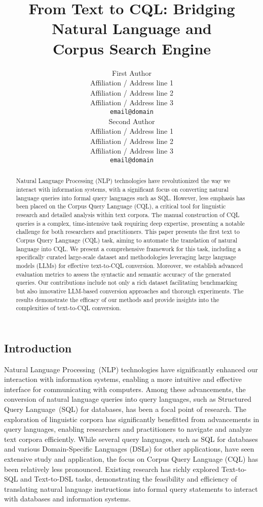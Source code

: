 \documentclass[11pt]{article}
\title{From Text to CQL: Bridging Natural Language and \\Corpus  Search Engine}
\author{First Author \\
  Affiliation / Address line 1 \\
  Affiliation / Address line 2 \\
  Affiliation / Address line 3 \\
  \texttt{email@domain} \\\And
  Second Author \\
  Affiliation / Address line 1 \\
  Affiliation / Address line 2 \\
  Affiliation / Address line 3 \\
  \texttt{email@domain} \\}
\begin{document}
\begin{CJK*}{UTF8}{gbsn}
\maketitle
\begin{abstract}
Natural Language Processing (NLP) technologies have revolutionized the way we interact with information systems, with a significant focus on converting natural language queries into formal query languages such as SQL. However, less emphasis has been placed on the Corpus Query Language (CQL), a critical tool for linguistic research and detailed analysis within text corpora. The manual construction of CQL queries is a complex, time-intensive task requiring deep expertise, presenting a notable challenge for both researchers and practitioners. This paper presents the first text to Corpus Query Language (CQL) task, aiming to automate the translation of natural language into CQL. We present a comprehensive framework for this task, including a specifically curated large-scale dataset and methodologies leveraging large language models (LLMs) for effective text-to-CQL conversion. Moreover, we establish advanced evaluation metrics to assess the syntactic and semantic accuracy of the generated queries. Our contributions include not only a rich dataset facilitating benchmarking but also innovative LLM-based conversion approaches and thorough experiments. The results demonstrate the efficacy of our methods and provide insights into the complexities of text-to-CQL conversion.
\end{abstract}





\section{Introduction}

Natural Language Processing~(NLP) technologies have significantly enhanced our interaction with information systems, enabling a more intuitive and effective interface for communicating with computers. Among these advancements, the conversion of natural language queries into query languages, such as Structured Query Language~(SQL) for databases, has been a focal point of research. The exploration of linguistic corpora has significantly benefitted from advancements in query languages, enabling researchers and practitioners to navigate and analyze text corpora efficiently. While several query languages, such as SQL for databases and various Domain-Specific Languages (DSLs) for other applications, have seen extensive study and application, the focus on Corpus Query Language (CQL) has been relatively less pronounced. Existing research has richly explored Text-to-SQL\citep{zhong2017seq2sql, liu2022tapex, yu-etal-2018-spider, li2023resdsql, gao2023texttosql, pourreza2023dinsql, dong2023c3, li2023can} and Text-to-DSL\citep{wang2023grammar, staniek2023texttooverpassql} tasks, demonstrating the feasibility and efficiency of translating natural language instructions into formal query statements to interact with databases and information systems.


\end{CJK*}
\end{document}
